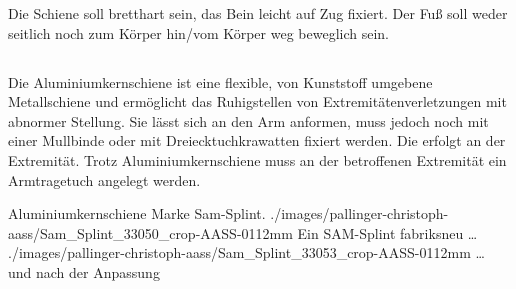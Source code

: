 Die Schiene soll bretthart sein, das Bein leicht auf Zug
fixiert. Der Fuß soll weder seitlich noch zum Körper hin/vom
Körper weg beweglich sein.


\subsection{}
\label{topic:sam-splint-anwendung}
\label{topic:aluminiumkernschiene}
\label{topic:schienung-arm}
\label{topic:sam-splint-beschreibung}



\Text{\TxBeschreibung}
{%
Die Aluminiumkernschiene ist eine flexible, von Kunststoff
umgebene Metallschiene und ermöglicht das Ruhigstellen von
Extremitätenverletzungen mit abnormer Stellung. Sie lässt
sich an den Arm anformen, muss jedoch noch mit einer
Mullbinde oder mit Dreiecktuchkrawatten fixiert werden. Die
 erfolgt an der  Extremität. Trotz Aluminiumkernschiene muss an der betroffenen Extremität ein Armtragetuch angelegt werden.
}

\begin{PictureSeries}{}{Aluminiumkernschiene Marke Sam-Splint{\texttrademark}. }
{./images/pallinger-christoph-aass/Sam_Splint_33050_crop-AASS-0112mm}
{Ein SAM-Splint{\texttrademark} fabriksneu \ldots}
{./images/pallinger-christoph-aass/Sam_Splint_33053_crop-AASS-0112mm}
{{\ldots} und nach der Anpassung}
{}{}{}{}
\end{PictureSeries}

\begin{ProcedureStepsNoHeading}


\end{ProcedureStepsNoHeading}

